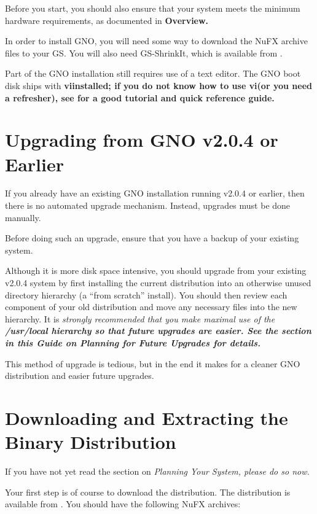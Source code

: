 \documentclass{report}
\begin{document}
Before you start, you should also ensure that your system meets the
minimum hardware requirements, as documented in \bf Overview\rm.

In order to install GNO, you will need some way to download the NuFX
archive files to your GS.  You will also need GS-ShrinkIt, which is available
from 
.

Part of the GNO installation still requires use of a text editor.  The
GNO boot disk ships with \bf vi\rm  installed;
if you do not know how to use \bf vi\rm  (or you need a refresher), see 
for a good tutorial and quick reference guide.

\section{Upgrading from GNO v2.0.4 or Earlier}

If you already have an existing GNO installation running v2.0.4 or 
earlier, then there is no automated upgrade mechanism.  Instead, upgrades
must be done manually.

Before doing such an upgrade, ensure that you have a backup of your 
existing system.

Although it is more disk space intensive, you should upgrade from your
existing v2.0.4 system by first installing the current distribution into
an otherwise unused directory hierarchy (a ``from scratch'' install).
You should then review each component of your old distribution and move
any necessary files into the new hierarchy.  It is \em strongly \rm 
recommended that you make maximal use of the \bf /usr/local \rm hierarchy
so that future upgrades are easier.  See the section in this Guide on
\bf Planning for Future Upgrades \rm for details.

This method of upgrade is tedious, but in the end it makes for a cleaner
GNO distribution and easier future upgrades.

\section{Downloading and Extracting the Binary Distribution}

If you have not yet read the section on \it Planning Your System\rm,
please do so now.

Your first step is of course to download the distribution.
The distribution is available from 
.
You should have the following NuFX archives:
\end{document}
